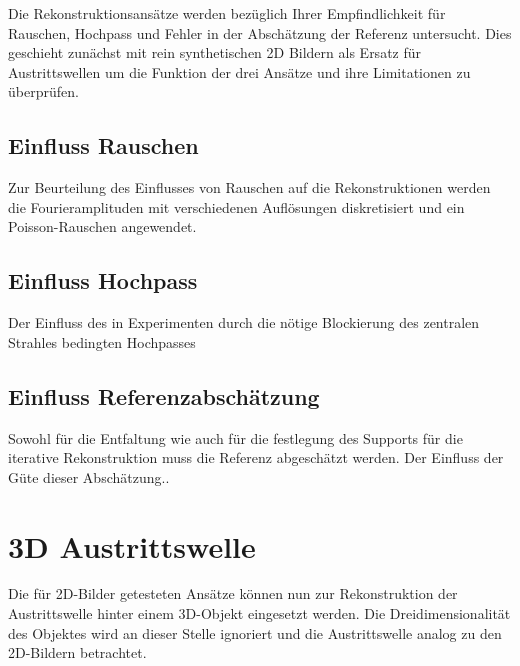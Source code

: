 Die Rekonstruktionsansätze werden bezüglich Ihrer Empfindlichkeit für Rauschen, Hochpass und Fehler in der Abschätzung der Referenz untersucht. Dies geschieht zunächst mit rein synthetischen 2D Bildern als Ersatz für Austrittswellen um die Funktion der drei Ansätze und ihre Limitationen zu überprüfen.

\subsection{Einfluss Rauschen}
Zur Beurteilung des Einflusses von Rauschen auf die Rekonstruktionen werden die Fourieramplituden mit verschiedenen Auflösungen diskretisiert und ein Poisson-Rauschen angewendet.
\subsection{Einfluss Hochpass}
Der Einfluss des in Experimenten durch die nötige Blockierung des zentralen Strahles bedingten Hochpasses
\subsection{Einfluss Referenzabschätzung}
Sowohl für die Entfaltung wie auch für die festlegung des Supports für die iterative Rekonstruktion muss die Referenz abgeschätzt werden. Der Einfluss der Güte dieser Abschätzung..

\section{3D Austrittswelle}
Die für 2D-Bilder getesteten Ansätze können nun zur Rekonstruktion der Austrittswelle hinter einem 3D-Objekt eingesetzt werden. Die Dreidimensionalität des Objektes wird an dieser Stelle ignoriert und die Austrittswelle analog zu den 2D-Bildern betrachtet.
